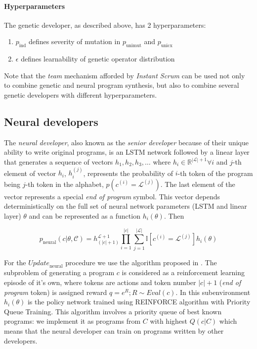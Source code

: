 \paragraph{Hyperparameters}
\label{sec:genhyper}

The genetic developer, as described above, has 2 hyperparameters:

\begin{enumerate}
    \item $p_\text{ind}$ defines severity of mutation in $p_\text{unimut}$ and $p_\text{unicx}$
    \item $\epsilon$ defines learnability of genetic operator distribution
\end{enumerate}

Note that the \emph{team} mechanism afforded by \emph{Instant Scrum} can be used not only to combine genetic and neural program synthesis, but also to combine several genetic developers with different hyperparameters.

\newpage \subsection{Neural developers}
\label{sec:neural}

The \emph{neural developer}, also known as the \emph{senior developer} because of their unique ability to write original programs, is an LSTM \cite{hochreiterLongShorttermMemory1997} network followed by a linear layer that generates a sequence of vectors $h_{1},h_{2},h_{3},\dots$ where $h_i \in \mathbb{R}^{|\mathcal{L}| + 1} \forall i$ and $j$-th element of vector $h_i$, $h_i^{(j)}$, represents the probability of $i$-th token of the program being $j$-th token in the alphabet, $p(c^{(i)}=\mathcal{L}^{(j)})$.
The last element of the vector represents a special \emph{end of program} symbol.
This vector depends deterministically on the full set of neural network parameters (LSTM and linear layer) $\theta$ and can be represented as a function $h_i(\theta)$.
Then

\begin{equation}
    p_\text{neural}(c | \theta, \mathcal{C}) = h_{(|c|+1)}^{\mathcal{L}+1}
    \prod\limits_{i=1}^{|c|}
    \sum\limits_{j=1}^{|\mathcal{L}|} \mathbb{I}[c^{(i)}=\mathcal{L}^{(j)}]
    h_i(\theta)
\end{equation}

For the $\mathit{Update}_\text{neural}$ procedure we use the algorithm proposed in \cite{abolafiaNeuralProgramSynthesis2018}.
The subproblem of generating a program $c$ is considered as a reinforcement learning episode of it's own, where tokens are actions and token number $|c|+1$ (\emph{end of program} token) is assigned reward $q = e^R; R \sim Eval(c)$. 
In this subenvironment $h_i(\theta)$ is the policy network \cite[chapter 13]{suttonReinforcementLearningSecond2018} trained using REINFORCE algorithm with Priority Queue Training.
This algorithm involves a priority queue of best known programs: we implement it as programs from $C$ with highest $Q(c|C)$ which means that the neural developer can train on programs written by other developers.

